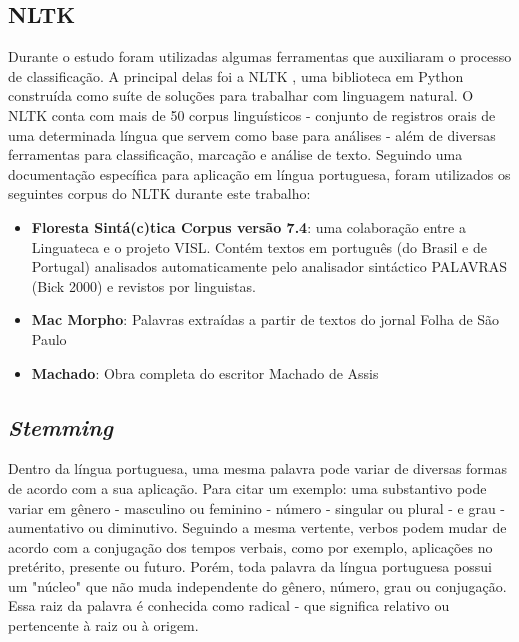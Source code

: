 \subsection{\ac{NLTK}}
Durante o estudo foram utilizadas algumas ferramentas que auxiliaram o processo de classificação. A principal delas foi a NLTK \cite{nltk_docs}, uma biblioteca em Python construída como suíte de soluções para trabalhar com linguagem natural. O NLTK conta com mais de 50 corpus linguísticos - conjunto de registros orais de uma determinada língua que servem como base para análises - além de diversas ferramentas para classificação, marcação e análise de texto. Seguindo uma documentação específica para aplicação em língua portuguesa\cite{nltk_portuguese}, foram utilizados os seguintes corpus do NLTK durante este trabalho:

\begin{itemize}
	\item \textbf{Floresta Sintá(c)tica Corpus versão 7.4}: uma colaboração entre a Linguateca\cite{linguateca} e o projeto VISL\cite{visl}. Contém textos em português (do Brasil e de Portugal) analisados automaticamente pelo analisador sintáctico PALAVRAS (Bick 2000) e revistos por linguistas.
	\item \textbf{Mac Morpho}: Palavras extraídas a partir de textos do jornal Folha de São Paulo 
	\item \textbf{Machado}: Obra completa do escritor Machado de Assis
\end{itemize}


\subsection{\textit{Stemming}}

Dentro da língua portuguesa, uma mesma palavra pode variar de diversas formas de acordo com a sua aplicação. Para citar um exemplo: uma substantivo pode variar em gênero - masculino ou feminino - número - singular ou plural - e grau - aumentativo ou diminutivo. Seguindo a mesma vertente, verbos podem mudar de acordo com a conjugação dos tempos verbais, como por exemplo, aplicações no pretérito, presente ou futuro.
Porém, toda palavra da língua portuguesa possui um "núcleo" que não muda independente do gênero, número, grau ou conjugação. Essa raiz da palavra é conhecida como radical - que significa relativo ou pertencente à raiz ou à origem. 

